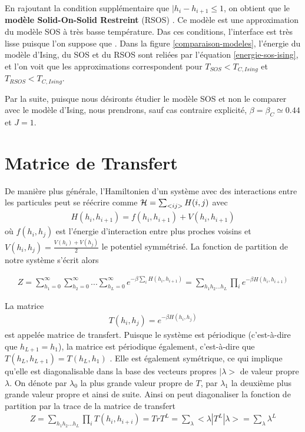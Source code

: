 En rajoutant la condition supplémentaire que $|h_i - h_{i+1} \leq 1$, on obtient que le \textbf{modèle Solid-On-Solid Restreint} (RSOS) \cite{privman_transfer-matrix_1989}. Ce modèle est une approximation du modèle SOS à très basse température.  Das ces conditions, l'interface est très lisse puisque l'on suppose que  \cite{kim_conserved_1994,vaysburd_critical_1995}. Dans la figure \ref{comparaison-modeles}, l'énergie du modèle d'Ising, du SOS et du RSOS sont reliées par l'équation \ref{energie-sos-ising}, et l'on voit que les approximations correspondent pour $T_{SOS} \less T_{C,Ising}$ et $T_{RSOS} \less T_{C,Ising}$. 

Par la suite, puisque nous désironts étudier le modèle SOS et non le comparer avec le modèle d'Ising, nous prendrons, sauf cas contraire explicité, $\beta = \beta_C \simeq 0.44$ et $J=1$. 

  \section{Matrice de Transfert}

	De manière plus générale, l'Hamiltonien d'un système avec des interactions entre les particules peut se réécrire comme $\mathcal{H} = \sum_{< ij >} H(i,j)$ avec
\begin{align*}
  H(h_i,h_{i+1}) = f(h_i,h_{i+1}) + V(h_i,h_{i+1}) 
\end{align*}
où $f(h_i,h_j)$ est l'énergie d'interaction entre plus proches voisins et $V(h_i,h_j)=\frac{V(h_i)+V(h_j)}{2}$ le potentiel symmétrisé.
La fonction de partition de notre système s'écrit alors 

\begin{align*}
 Z = \sum_{h_1=0}^\infty \sum_{h_2=0}^\infty ... \sum_{h_L=0}^\infty e^{- \beta \sum_{i} H(h_i,h_{i+1})}  
   = \sum_{h_1 h_2 ... h_L} \prod_{i} e^{-\beta H(h_i,h_{i+1})} 
\end{align*}

La matrice 
\begin{align}
    T(h_i,h_j) = e^{-\beta H(h_i,h_j)}
    \label{matric-transfert}
\end{align}
est appelée matrice de transfert. Puisque le système est périodique (c'est-à-dire que $h_{L+1} = h_1$),  la matrice est périodique également, c'est-à-dire que $T(h_L,h_{L+1}) = T(h_L,h_1)$ \cite{pearce_exact_1989}. Elle est également symétrique, ce qui implique qu'elle est diagonalisable dans la base des vecteurs propres $|\lambda >$ de valeur propre $\lambda$. On dénote par $\lambda_0$ la plus grande valeur propre de $T$, par $\lambda_1$ la deuxième plus grande valeur propre et ainsi de suite.
Ainsi on peut diagonaliser la fonction de partition par la trace de la matrice de transfert \cite{abraham_transfer_1973}
\begin{align}
  Z = \sum_{h_1 h_2 ... h_L} \prod_{i} T(h_i,h_{i+i}) = Tr T^L  = \sum_\lambda <\lambda | T^L | \lambda> = \sum_\lambda \lambda^L
  \label{partition-trace-lambda}
\end{align}


